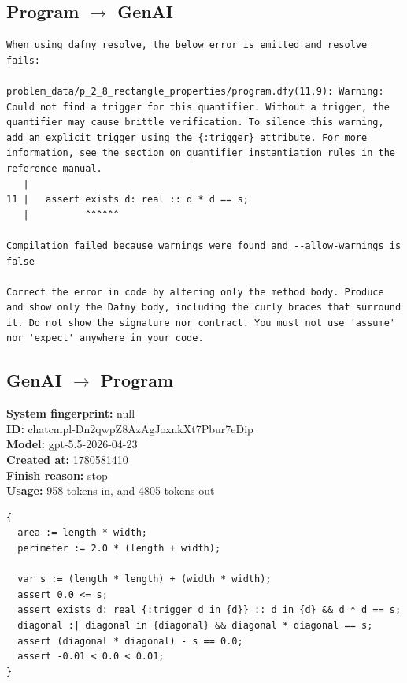 \documentclass{article}
\begin{document}
\subsection*{Program $\rightarrow$ GenAI}
\begin{lstlisting}
When using dafny resolve, the below error is emitted and resolve fails:

problem_data/p_2_8_rectangle_properties/program.dfy(11,9): Warning: Could not find a trigger for this quantifier. Without a trigger, the quantifier may cause brittle verification. To silence this warning, add an explicit trigger using the {:trigger} attribute. For more information, see the section on quantifier instantiation rules in the reference manual.
   |
11 |   assert exists d: real :: d * d == s;
   |          ^^^^^^

Compilation failed because warnings were found and --allow-warnings is false

Correct the error in code by altering only the method body. Produce and show only the Dafny body, including the curly braces that surround it. Do not show the signature nor contract. You must not use 'assume' nor 'expect' anywhere in your code.
\end{lstlisting}
\subsection*{GenAI $\rightarrow$ Program}
\textbf{System fingerprint: }null
\\\textbf{ID: }chatcmpl-Dn2qwpZ8AzAgJoxnkXt7Pbur7eDip
\\\textbf{Model: }gpt-5.5-2026-04-23
\\\textbf{Created at: }1780581410
\\\textbf{Finish reason: }stop
\\\textbf{Usage: }958 tokens in, and 4805 tokens out
\begin{lstlisting}
{
  area := length * width;
  perimeter := 2.0 * (length + width);

  var s := (length * length) + (width * width);
  assert 0.0 <= s;
  assert exists d: real {:trigger d in {d}} :: d in {d} && d * d == s;
  diagonal :| diagonal in {diagonal} && diagonal * diagonal == s;
  assert (diagonal * diagonal) - s == 0.0;
  assert -0.01 < 0.0 < 0.01;
}
\end{lstlisting}
\end{document}
